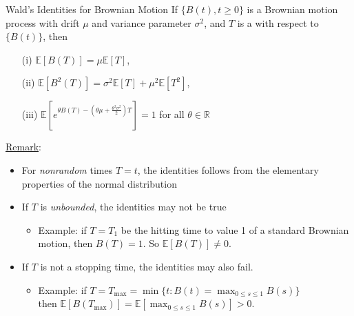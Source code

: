 \documentclass[letterpaper,handout]{beamer}
\def\E{\mathbb E}
\begin{document}
\begin{frame}{Wald's Identities for Brownian Motion}
If $\{B(t), t \ge 0\}$ is a Brownian motion process
with drift $\mu$  and variance parameter $\sigma^2$,
and $T$ is a  with respect to $\{B(t)\}$, then
\begin{itemize}
\item[(i)] $\E[B(T)]=\mu\E[T]$,
\item[(ii)] $\E[B^2(T)]=\sigma^2\E[T]+\mu^2\E[T^2]$,
\item[(iii)] $\E[e^{\theta B(T)-(\theta\mu+\frac{\theta^2\sigma^2}{2})T}]=1$ for all $\theta\in\mathbb{R}$
\end{itemize}

\underline{Remark}:
\begin{itemize}
\item For {\em nonrandom} times $T=t$, the identities follows from the elementary properties of the normal distribution%
\item If $T$ is {\em unbounded}, the identities may not be true\\
\begin{itemize}
\item Example: if $T=T_1$ be the hitting time to value 1 of a standard Brownian motion, then $B(T)=1$. So $\E[B(T)]\neq 0.$
\end{itemize}
\item If $T$ is not a stopping time, the identities may also fail.\\
\begin{itemize}
\item Example: if $T=T_{\max}=\min\{t: B(t)=\max_{0\le s\le 1}B(s)\}$ \\
 then $\E[B(T_{\max})]=\E[\max_{0\le s\le 1}B(s)]>0.$
 \end{itemize}
\end{itemize}
\end{frame}
\end{document}
